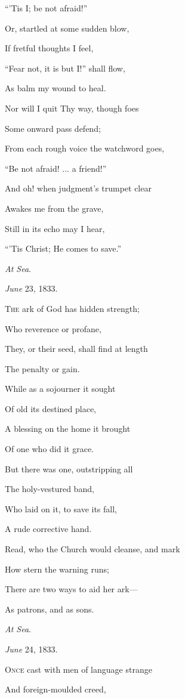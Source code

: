 ``'Tis I; be not afraid!''

Or, startled at some sudden blow,

If fretful thoughts I feel,

``Fear not, it is but I!'' shall flow,

As balm my wound to heal.

Nor will I quit Thy way, though foes

Some onward pass defend;

From each rough voice the watchword goes,

``Be not afraid! ... a friend!'' 

And oh! when judgment's trumpet clear

Awakes me from the grave,

Still in its echo may I hear,

``'Tis Christ; He comes to save.''

\emph{At Sea}.

\emph{June} 23, 1833.


T\textsc{he} ark of God has hidden strength;

Who reverence or profane,

They, or their seed, shall find at length

The penalty or gain.

While as a sojourner it sought

Of old its destined place,

A blessing on the home it brought

Of one who did it grace.

But there was one, outstripping all

The holy-vestured band,

Who laid on it, to save its fall,

A rude corrective hand.

Read, who the Church would cleanse, and mark

How stern the warning runs;

There are two ways to aid her ark—

As patrons, and as sons.

\emph{At Sea}.

\emph{June} 24, 1833.


O\textsc{nce} cast with men of language strange

And foreign-moulded creed,

